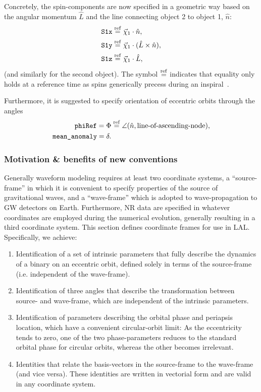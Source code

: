 \documentclass[11pt,tightenlines,article,amssymb,amsmath,amsfonts,superscriptaddress,nofootinbib]{revtex4}
\newcommand{\nNR}{\hat{n}}
\newcommand{\lNR}{\hat L}
\newcommand{\phiRef}{\Phi} %
\newcommand{\equalref}{\overset{\rm ref}{=}}
\begin{document}
Concretely, the spin-components are now specified in a geometric
way based on the angular momentum $\lNR$ and the line connecting object 2 to
object 1, $\nNR$:
\begin{align}
  \mbox{\tt S1x}&\equalref \vec\chi_1\cdot\nNR,\\
  \mbox{\tt S1y}&\equalref \vec\chi_1\cdot (\lNR\times\nNR),\\
  \mbox{\tt S1z}&\equalref \vec\chi_1\cdot\lNR,
\end{align}
(and similarly for the second object). The symbol $\equalref$ indicates
that equality only holds at a reference time as spins generically
precess during an inspiral~\cite{Apostolatos:1994mx, Kidder:1995zr}.

Furthermore, it is suggested to specify
orientation of eccentric orbits through the angles
\begin{align}
  \mbox{\tt phiRef} = \phiRef &\equalref \angle(\nNR, \mbox{line-of-ascending-node}),\\
  \mbox{\tt mean\_anomaly}= \delta.& 
  \end{align}

\subsubsection{Motivation \& benefits of new conventions}
Generally waveform modeling requires at least two coordinate
systems, a ``source-frame'' in which it is convenient to specify
properties of the source of gravitational waves, and a ``wave-frame''
which is adopted to wave-propagation to GW detectors on Earth.
Furthermore, NR data are specified in whatever
coordinates are employed during the numerical evolution, generally
resulting in a third coordinate system. This section defines coordinate frames 
for use in LAL. Specifically, we
achieve:
\begin{enumerate}
  \item Identification of a set of intrinsic parameters that fully
    describe the dynamics of a binary on an eccentric orbit,
    defined solely in terms of the source-frame (i.e. independent of
    the wave-frame).
  \item Identification of three angles that describe the
    transformation between source- and wave-frame, which are
    independent of the intrinsic parameters.
  \item Identification of parameters describing the orbital phase and
    periapsis location, which have a convenient circular-orbit limit:
    As the eccentricity tends to zero, one of the two phase-parameters
    reduces to the standard orbital phase for circular orbits, whereas
    the other becomes irrelevant.
  \item Identities that relate the basis-vectors in the source-frame to the
    wave-frame (and vice versa).  These identities are written in
    vectorial form and are valid in any coordinate system.
\end{enumerate}
\end{document}
